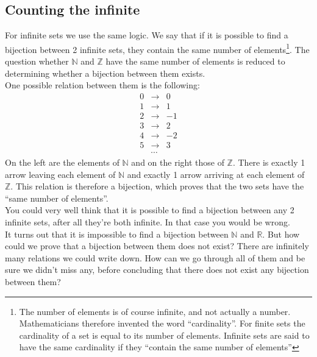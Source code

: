 \subsection{Counting the infinite}
\label{Cantor_Tangent}

\noindent For infinite sets we use the same logic. We say that if it is possible to find a bijection between 2 infinite sets, they contain the same number of elements\footnote{The number of elements is of course infinite, and not actually a number. Mathematicians therefore invented the word "`cardinality"'. For finite sets the cardinality of a set is equal to its number of elements. Infinite sets are said to have the same cardinality if they "`contain the same number of elements"'}. The question whether $\mathbb{N}$ and $\mathbb{Z}$ have the same number of elements is reduced to determining whether a bijection between them exists.\\

\noindent One possible relation between them is the following:
\begin{eqnarray*}
0 & \rightarrow & 0  \\
1 & \rightarrow & 1  \\
2 & \rightarrow & -1 \\
3 & \rightarrow & 2  \\
4 & \rightarrow & -2  \\
5 & \rightarrow & 3  \\
 & \cdots & 
\end{eqnarray*}
On the left are the elements of $\mathbb{N}$ and on the right those of $\mathbb{Z}$. There is exactly 1 arrow leaving each element of $\mathbb{N}$ and exactly 1 arrow arriving at each element of $\mathbb{Z}$. This relation is therefore a bijection, which proves that the two sets have the "`same number of elements"'.\\

\noindent You could very well think that it is possible to find a bijection between any 2 infinite sets, after all they're both infinite. In that case you would be wrong.\\

\noindent It turns out that it is impossible to find a bijection between $\mathbb{N}$ and $\mathbb{R}$. But how could we prove that a bijection between them does not exist? There are infinitely many relations we could write down. How can we go through all of them and be sure we didn't miss any, before concluding that there does not exist any bijection between them?\\

